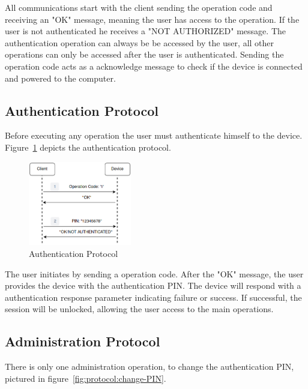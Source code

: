 All communications start with the client sending the operation code and receiving an "OK" message, meaning the user has access to the operation. If the user is not authenticated he receives a "NOT AUTHORIZED" message.
The authentication operation can always be be accessed by the user, all other operations can only be accessed after the user is authenticated.
Sending the operation code acts as a acknowledge message to check if the device is connected and powered to the computer.

\subsection{Authentication Protocol}\label{chap:implementation:protocol:auth}

Before executing any operation the user must authenticate himself to the device.
Figure~\ref{fig:protocol:authentication} depicts the authentication protocol.

\begin{figure}[h!]
	\centering
	\includegraphics[width=0.4\textwidth]{./Images/authentication.png}
	\caption{Authentication Protocol}
	\label{fig:protocol:authentication}
\end{figure}

The user initiates by sending a operation code. After the "OK" message, the user provides the device with the authentication \ac{PIN}. The device will respond with a authentication response parameter indicating failure or success. If successful, the session will be unlocked, allowing the user access to the main operations.

\subsection{Administration Protocol}\label{chap:implementation:protocol:admin}

There is only one administration operation, to change the authentication \ac{PIN}, pictured in figure~\ref{fig:protocol:change-PIN}.

